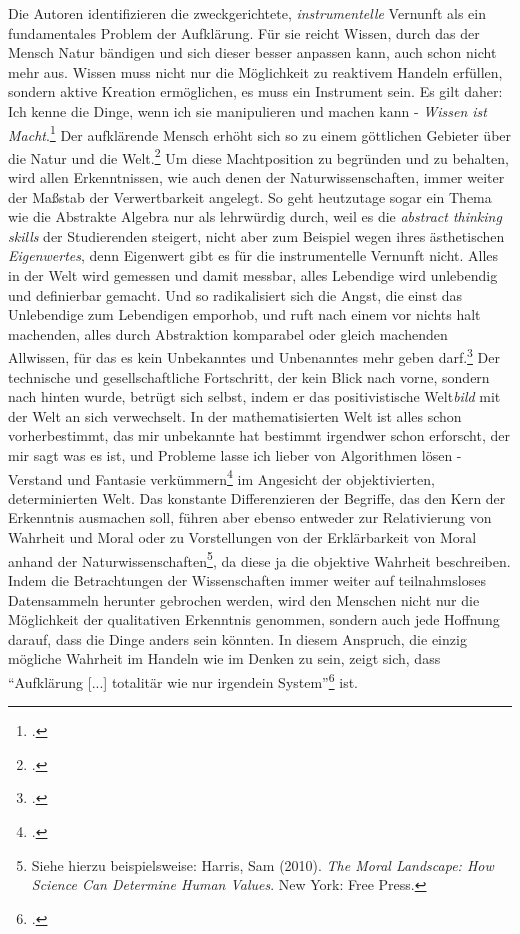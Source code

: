 \documentclass[a4paper, 12pt]{article}
\begin{document}
\begin{onehalfspace}
Die Autoren identifizieren die zweckgerichtete, \emph{instrumentelle} Vernunft als ein fundamentales Problem der Aufklärung. Für sie reicht Wissen, durch das der Mensch Natur bändigen und sich dieser besser anpassen kann, auch schon nicht mehr aus. Wissen muss nicht nur die Möglichkeit zu reaktivem Handeln erfüllen, sondern aktive Kreation ermöglichen, es muss ein Instrument sein. Es gilt daher: Ich kenne die Dinge, wenn ich sie manipulieren und machen kann - \emph{Wissen ist Macht}.\footnote{\Cite[Vgl.][S. 15]{dialektik-der-aufklaerung}.} Der aufklärende Mensch erhöht sich so zu einem göttlichen Gebieter über die Natur und die Welt.\footnote{\Cite[Vgl.][S. 15]{dialektik-der-aufklaerung}.} Um diese Machtposition zu begründen und zu behalten, wird allen Erkenntnissen, wie auch denen der Naturwissenschaften, immer weiter der Maßstab der Verwertbarkeit angelegt. So geht heutzutage sogar ein Thema wie die Abstrakte Algebra nur als lehrwürdig durch, weil es die \emph{abstract thinking skills} der Studierenden steigert, nicht aber zum Beispiel wegen ihres ästhetischen \emph{Eigenwertes}, denn Eigenwert gibt es für die instrumentelle Vernunft nicht. Alles in der Welt wird gemessen und damit messbar, alles Lebendige wird unlebendig und definierbar gemacht. Und so radikalisiert sich die Angst, die einst das Unlebendige zum Lebendigen emporhob, und ruft nach einem vor nichts halt machenden, alles durch Abstraktion komparabel oder gleich machenden Allwissen, für das es kein Unbekanntes und Unbenanntes mehr geben darf.\footnote{\Cite[Vgl.][S. 22 f.]{dialektik-der-aufklaerung}.} Der technische und gesellschaftliche Fortschritt, der kein Blick nach vorne, sondern nach hinten wurde, betrügt sich selbst, indem er das positivistische Welt\emph{bild} mit der Welt an sich verwechselt. In der mathematisierten Welt ist alles schon vorherbestimmt, das mir unbekannte hat bestimmt irgendwer schon erforscht, der mir sagt was es ist, und Probleme lasse ich lieber von Algorithmen lösen - Verstand und Fantasie verkümmern\footnote{\Cite[Vgl.][S. 42]{dialektik-der-aufklaerung}.} im Angesicht der objektivierten, determinierten Welt. Das konstante Differenzieren der Begriffe, das den Kern der Erkenntnis ausmachen soll, führen aber ebenso entweder zur Relativierung von Wahrheit und Moral oder zu Vorstellungen von der Erklärbarkeit von Moral anhand der Naturwissenschaften\footnote{Siehe hierzu beispielsweise: Harris, Sam (2010). \emph{The Moral Landscape: How Science Can Determine Human Values}. New York: Free Press.}, da diese ja die objektive Wahrheit beschreiben. Indem die Betrachtungen der Wissenschaften immer weiter auf teilnahmsloses Datensammeln herunter gebrochen werden, wird den Menschen nicht nur die Möglichkeit der qualitativen Erkenntnis genommen, sondern auch jede Hoffnung darauf, dass die Dinge anders sein könnten. In diesem Anspruch, die einzig mögliche Wahrheit im Handeln wie im Denken zu sein, zeigt sich, dass "`Aufklärung [...] totalitär wie nur irgendein System"'\footnote{\Cite[Siehe][S. 31]{dialektik-der-aufklaerung}.} ist. 


\end{onehalfspace}
\end{document}
